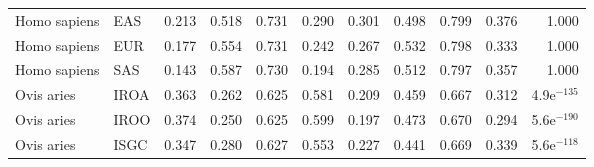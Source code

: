 \begin{longtable}{llrrrrrrrrr}
        Homo sapiens &                       EAS &                              0.213 &                               0.518 &                 0.731 &                 0.290 &                              0.301 &                               0.498 &                 0.799 &                 0.376 &         1.000 \\
        Homo sapiens &                       EUR &                              0.177 &                               0.554 &                 0.731 &                 0.242 &                              0.267 &                               0.532 &                 0.798 &                 0.333 &         1.000 \\
        Homo sapiens &                       SAS &                              0.143 &                               0.587 &                 0.730 &                 0.194 &                              0.285 &                               0.512 &                 0.797 &                 0.357 &         1.000 \\
          Ovis aries &                      IROA &                              0.363 &                               0.262 &                 0.625 &                 0.581 &                              0.209 &                               0.459 &                 0.667 &                 0.312 & 4.9e$^{-135}$ \\
          Ovis aries &                      IROO &                              0.374 &                               0.250 &                 0.625 &                 0.599 &                              0.197 &                               0.473 &                 0.670 &                 0.294 & 5.6e$^{-190}$ \\
          Ovis aries &                      ISGC &                              0.347 &                               0.280 &                 0.627 &                 0.553 &                              0.227 &                               0.441 &                 0.669 &                 0.339 & 5.6e$^{-118}$ \\
\end{longtable}
